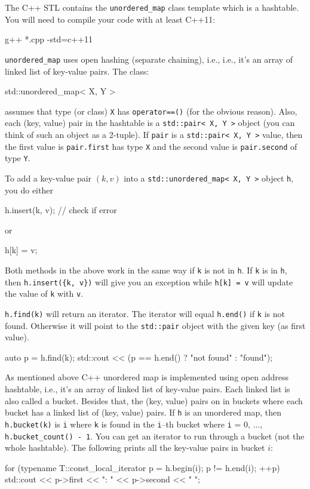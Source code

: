 
The C++ STL contains the \verb!unordered_map! class template
which is a hashtable.
You will need to compile your code with at least C++11:
\begin{console}
g++ *.cpp -std=c++11
\end{console}
\verb!unordered_map! uses open hashing (separate chaining), i.e., 
i.e., it's an array of linked list of key-value pairs.
The class:
\begin{console}
std::unordered_map< X, Y >
\end{console}
assumes that type (or class) \verb!X! has
\verb!operator==()!
(for the obvious reason).
Also, each (key, value) pair in the hashtable
is a \verb!std::pair< X, Y >! object
(you can think of such an object as a 2-tuple).
If \verb!pair! is a
\verb!std::pair< X, Y >! value,
then the first value is \verb!pair.first! has type \verb!X!
and the second value is \verb!pair.second! of type \verb!Y!.

To add a key-value pair $(k,v)$ into a
\verb!std::unordered_map< X, Y >! object \verb!h!, you do either
\begin{console}
h.insert({k, v}); // check if error
\end{console}
or
\begin{console}
h[k] = v;
\end{console}
Both methods in the above work in the same way if \verb!k! is not in \verb!h!.
If \verb!k! is in \verb!h!, then
\verb!h.insert({k, v})! will give you an exception
while
\verb!h[k] = v! will update the value of \verb!k! with \verb!v!.

\verb!h.find(k)! will return an iterator.
The iterator will equal \verb!h.end()! if \verb!k! is not found.
Otherwise it will point to the
\verb!std::pair! object with the given key (as first value).
\begin{console}
auto p = h.find(k);
std::cout << (p == h.end() ? "not found\n" : "found\n");  
\end{console}

As mentioned above C++ unordered map is implemented using open address hashtable,
i.e., it's an array of linked list of key-value pairs.
Each linked list is also called a bucket.
Besides that, the (key, value) pairs on in buckets
where each bucket has a linked list of (key, value) pairs.
If \verb!h! is an unordered map,
then \verb!h.bucket(k)! is \verb!i! where
\verb!k! is found in the \verb!i!--th bucket
where \verb!i! = 0, ..., \verb!h.bucket_count() - 1!.
You can get an iterator to run through a bucket (not the whole hashtable).
The following prints all the key-value pairs in bucket $i$:
\begin{console}
for (typename T::const_local_iterator p = h.begin(i);
     p != h.end(i); ++p)
{
    std::cout << p->first << ": " << p->second << "  ";
}
\end{console}

